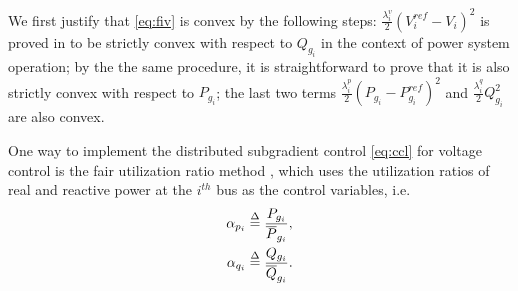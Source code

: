 \documentclass{article}
\begin{document}
We first justify that \eqref{eq:fiv} is convex by the following steps: $\frac{\lambda^v_i}{2}(V_i^{ref}-V_i)^2$ is proved in \cite{azwirman2019res,Gusrialdi2019} to be strictly convex with respect to $Q_{g_i}$ in the context of power system operation; by the the same procedure, it is straightforward to prove that it is also strictly convex with respect to $P_{g_i}$; the last two terms $\frac{\lambda^p_i}{2}(P_{g_i}-P^{ref}_{g_i})^2$ and $\frac{\lambda^q_i}{2}Q_{g_i}^2$ are also convex. 

One way to implement the distributed subgradient control \eqref{eq:ccl} for voltage control is the fair utilization ratio method \cite{maknouninejad2014realizing}, which uses the utilization ratios of real and reactive power at the $i^{th}$ bus as the control variables, i.e.
 \begin{subequations}
\begin{align}
    \alpha_{p_i} &\overset{\Delta}{=} \frac{P_{g_i}}{\overline P_{g_i}},\label{eq:alfap}
\\
    \alpha_{q_i} &\overset{\Delta}{=} \frac{Q_{g_i}}{\overline Q_{g_i}}.\label{eq:alfaq}
\end{align}
\label{eq:alfa}\noindent
\end{subequations}
\end{document}
